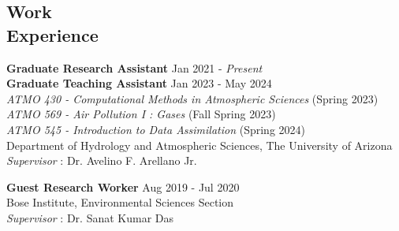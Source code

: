 \documentclass[margin,line]{resume}
\begin{document}
\begin{resume}
		\section{\mysidestyle \textbf{\textcolor{sep}{Work \\Experience}}}
		
		\textbf{Graduate Research Assistant} \hfill Jan 2021 - \textit{Present}  \\
		\textbf{Graduate Teaching Assistant} \hfill Jan 2023 - May 2024  \\
		\hspace*{2mm} \textit{ATMO 430 - Computational Methods in Atmospheric Sciences} (Spring 2023) \\
		\hspace*{2mm}  \textit{ATMO 569 - Air Pollution I : Gases} (Fall Spring 2023) \\
		\hspace*{2mm}  \textit{ATMO 545 - Introduction to Data Assimilation} (Spring 2024) \\
		Department of Hydrology and Atmospheric Sciences, The University of Arizona \\
		\textit{ Supervisor} : Dr. Avelino F. Arellano Jr.
		
		\textbf{Guest Research Worker} \hfill Aug 2019 - Jul 2020 \\
		Bose Institute, Environmental Sciences Section \\
		\textit{Supervisor} : Dr. Sanat Kumar Das 
		
		\vspace*{-3mm}    
		
		

\end{resume}
\end{document}
